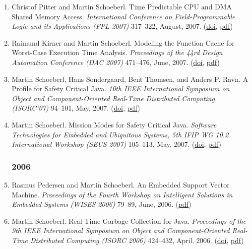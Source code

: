 \begin{enumerate}
\item Christof Pitter and Martin Schoeberl.
 Time Predictable CPU and DMA Shared Memory Access.
 \emph{International Conference on Field-Programmable Logic and its Applications (FPL 2007)} 317--322, August, 2007.
(\href{http://dx.doi.org/10.1109/FPL.2007.4380666}{doi}, \href{http://www.jopdesign.com/doc/jopvga_fpl2007.pdf}{pdf})

\item Raimund Kirner and Martin Schoeberl.
 Modeling the Function Cache for Worst-Case Execution Time Analysis.
 \emph{Proceedings of the 44rd Design Automation Conference (DAC 2007)} 471--476, June, 2007.
(\href{http://dx.doi.org/10.1145/1278480.1278603}{doi}, \href{http://www.jopdesign.com/doc/cache_dac2007.pdf}{pdf})

\item Martin Schoeberl, Hans Sondergaard, Bent Thomsen, and Anders P. Ravn.
 A Profile for Safety Critical Java.
 \emph{10th IEEE International Symposium on Object and Component-Oriented Real-Time Distributed Computing (ISORC'07)} 94--101, May, 2007.
(\href{http://dx.doi.org/10.1109/ISORC.2007.9}{doi}, \href{http://www.jopdesign.com/doc/scjava_isorc2007.pdf}{pdf})

\item Martin Schoeberl.
 Mission Modes for Safety Critical Java.
 \emph{Software Technologies for Embedded and Ubiquitous Systems, 5th {IFIP} {WG} 10.2 International Workshop (SEUS 2007)} 105--113, May, 2007.
(\href{http://dx.doi.org/10.1007/978-3-540-75664-4_11}{doi}, \href{http://www.jopdesign.com/doc/scjava_modes.pdf}{pdf})


\subsubsection*{2006}

\item Rasmus Pedersen and Martin Schoeberl.
 An Embedded Support Vector Machine.
 \emph{Proceedings of the Fourth Workshop on Intelligent Solutions in Embedded Systems (WISES 2006)} 79--89, June, 2006.
(\href{http://www.jopdesign.com/doc/rtsvm_wises2006.pdf}{pdf})

\item Martin Schoeberl.
 Real-Time Garbage Collection for Java.
 \emph{Proceedings of the 9th IEEE International Symposium on Object and Component-Oriented Real-Time Distributed Computing (ISORC 2006)} 424--432, April, 2006.
(\href{http://dx.doi.org/10.1109/ISORC.2006.66}{doi}, \href{http://www.jopdesign.com/doc/rtgc_sched.pdf}{pdf})


\end{enumerate}
